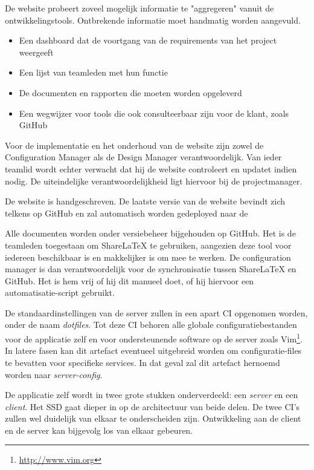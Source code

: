 De website probeert zoveel mogelijk informatie te "aggregeren"  vanuit de ontwikkelingstools. Ontbrekende informatie moet handmatig worden aangevuld.
\begin{itemize}
\item Een dashboard dat de voortgang van de requirements van het project weergeeft
\item Een lijst van teamleden met hun functie
\item De documenten en rapporten die moeten worden opgeleverd
\item Een wegwijzer voor tools die ook consulteerbaar zijn voor de klant, zoals GitHub
\end{itemize}

Voor de implementatie en het onderhoud van de website zijn zowel de Configuration Manager als de Design Manager verantwoordelijk. Van ieder teamlid wordt echter verwacht dat hij de website controleert en updatet indien nodig. De uiteindelijke verantwoordelijkheid ligt hiervoor bij de projectmanager.

De website is handgeschreven. De laatste versie van de website bevindt zich telkens op GitHub en zal automatisch worden gedeployed naar de 


Alle documenten worden onder versiebeheer bijgehouden op GitHub. Het is de teamleden toegestaan om ShareLaTeX te gebruiken, aangezien deze tool voor iedereen beschikbaar is en makkelijker is om mee te werken. De configuration manager is dan verantwoordelijk voor de synchronisatie tussen ShareLaTeX en GitHub. Het is hem vrij of hij dit manueel doet, of hij hiervoor een automatisatie-script gebruikt.


De standaardinstellingen van de server zullen in een apart CI opgenomen worden, onder de naam \textit{dotfiles}. Tot deze CI behoren alle globale configuratiebestanden voor de applicatie zelf en voor ondersteunende software op de server zoals Vim\footnote{\url{http://www.vim.org}}. In latere fasen kan dit artefact eventueel uitgebreid worden om configuratie-files te bevatten voor specifieke services. In dat geval zal dit artefact hernoemd worden naar \textit{server-config}.


De applicatie zelf wordt in twee grote stukken onderverdeeld: een \textit{server} en een \textit{client}. Het SSD gaat dieper in op de architectuur van beide delen. De twee CI's zullen wel duidelijk van elkaar te onderscheiden zijn. Ontwikkeling aan de client en de server kan bijgevolg los van elkaar gebeuren.

